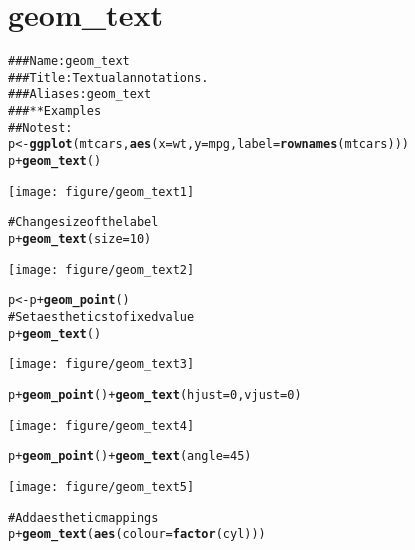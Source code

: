 \documentclass[a4paper,titlepage]{tufte-handout}\usepackage{graphicx, color}
\makeatletter
\def\maxwidth{ %
  \ifdim\Gin@nat@width>\linewidth
    \linewidth
  \else
    \Gin@nat@width
  \fi
}
\newcommand{\hlfunctioncall}[1]{\textcolor[rgb]{0.501960784313725,0,0.329411764705882}{\textbf{#1}}}%
\newcommand{\hlcomment}[1]{\textcolor[rgb]{0.180392156862745,0.6,0.341176470588235}{#1}}%
\newenvironment{kframe}{%
 \def\at@end@of@kframe{}%
 \ifinner\ifhmode%
  \def\at@end@of@kframe{\end{minipage}}%
  \begin{minipage}{\columnwidth}%
 \fi\fi%
 \def\FrameCommand##1{\hskip\@totalleftmargin \hskip-\fboxsep
 \colorbox{shadecolor}{##1}\hskip-\fboxsep
     \hskip-\linewidth \hskip-\@totalleftmargin \hskip\columnwidth}%
 \MakeFramed {\advance\hsize-\width
   \@totalleftmargin\z@ \linewidth\hsize
   \@setminipage}}%
 {\par\unskip\endMakeFramed%
 \at@end@of@kframe}
\newenvironment{knitrout}{}{} %
\makeatother
\begin{document}
\section{geom\_text}

\begin{knitrout}
\color{fgcolor}\begin{kframe}
\begin{alltt}
\hlcomment{### Name: geom_text}
\hlcomment{### Title: Textual annotations.}
\hlcomment{### Aliases: geom_text}
\hlcomment{### ** Examples}
\hlcomment{## No test: }
p <- \hlfunctioncall{ggplot}(mtcars, \hlfunctioncall{aes}(x=wt, y=mpg, label=\hlfunctioncall{rownames}(mtcars)))
p + \hlfunctioncall{geom_text}()
\end{alltt}
\end{kframe}\texttt{[image: figure/geom\_text1]} \begin{kframe}\begin{alltt}
\hlcomment{# Change size of the label}
p + \hlfunctioncall{geom_text}(size=10)
\end{alltt}
\end{kframe}\texttt{[image: figure/geom\_text2]} \begin{kframe}\begin{alltt}
p <- p + \hlfunctioncall{geom_point}()
\hlcomment{# Set aesthetics to fixed value}
p + \hlfunctioncall{geom_text}()
\end{alltt}
\end{kframe}\texttt{[image: figure/geom\_text3]} \begin{kframe}\begin{alltt}
p + \hlfunctioncall{geom_point}() + \hlfunctioncall{geom_text}(hjust=0, vjust=0)
\end{alltt}
\end{kframe}\texttt{[image: figure/geom\_text4]} \begin{kframe}\begin{alltt}
p + \hlfunctioncall{geom_point}() + \hlfunctioncall{geom_text}(angle = 45)
\end{alltt}
\end{kframe}\texttt{[image: figure/geom\_text5]} \begin{kframe}\begin{alltt}
\hlcomment{# Add aesthetic mappings}
p + \hlfunctioncall{geom_text}(\hlfunctioncall{aes}(colour=\hlfunctioncall{factor}(cyl)))
\end{alltt}

\end{kframe}
\end{knitrout}
\end{document}
